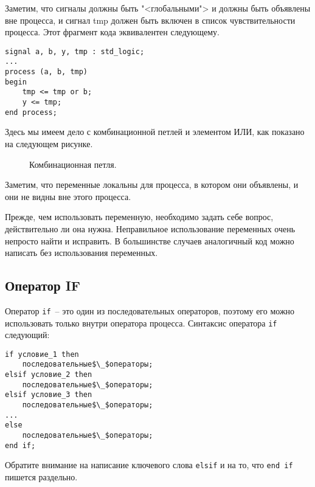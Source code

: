 Заметим, что сигналы должны быть "<глобальными"> и должны быть объявлены вне процесса, и сигнал tmp должен быть включен в список чувствительности процесса. Этот фрагмент кода эквивалентен следующему.

\begin{Code}
\begin{lstlisting}
signal a, b, y, tmp : std_logic;
...
process (a, b, tmp)
begin
    tmp <= tmp or b;
    y <= tmp;
end process;
\end{lstlisting}
\end{Code}

Здесь мы имеем дело с комбинационной петлей и элементом ИЛИ, как показано на следующем рисунке.

\begin{figure}[ht]
\centering
{}
\caption{Комбинационная петля.}
\label{comb_loop}
\end{figure}

Заметим, что переменные локальны для процесса, в котором они объявлены, и они не видны вне этого процесса.

Прежде, чем использовать переменную, необходимо задать себе вопрос, действительно ли она нужна. Неправильное использование переменных очень непросто найти и исправить. В большинстве случаев аналогичный код можно написать без использования переменных.

\subsection{Оператор IF}
Оператор \lstinline?if?~-- это один из последовательных операторов, поэтому его можно использовать только внутри оператора процесса. Синтаксис оператора \lstinline?if? следующий:

\begin{Code}
\begin{lstlisting}[mathescape]
if условие_1 then
    последовательные$\_$операторы;
elsif условие_2 then
    последовательные$\_$операторы;
elsif условие_3 then
    последовательные$\_$операторы;
...
else
    последовательные$\_$операторы;
end if;
\end{lstlisting}
\end{Code}

Обратите внимание на написание ключевого слова \lstinline?elsif? и на то, что \lstinline?end if? пишется раздельно.

